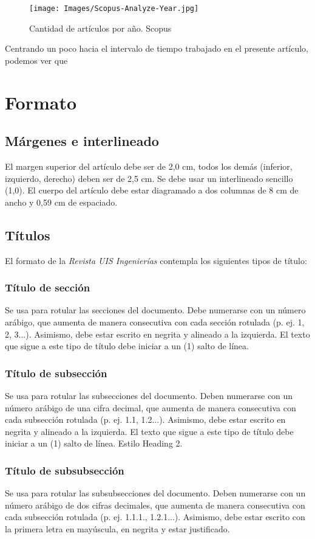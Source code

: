 \documentclass[10pt,letterpaper,twoside,twocolumn]{article}   %
\begin{document}
\begin{figure}
  \centering
  \texttt{[image: Images/Scopus-Analyze-Year.jpg]}
  \caption{Cantidad de artículos por año. Scopus}
  \label{yearResults}
\end{figure}

Centrando un poco hacia el intervalo de tiempo trabajado en el presente artículo, podemos ver que 



\section{Formato}
\subsection{Márgenes e interlineado}
El margen superior del artículo debe ser de 2,0 cm, todos los demás (inferior, izquierdo, derecho) deben ser de 2,5 cm. Se debe usar un interlineado sencillo (1,0). El cuerpo del artículo debe estar diagramado a dos columnas de 8 cm de ancho y 0,59 cm de espaciado.
\subsection{Títulos}
El formato de la \textit{Revista UIS Ingenierías} contempla los siguientes tipos de título:
\subsubsection{Título de sección}
Se usa para rotular las secciones del documento. Debe numerarse con un número arábigo, que aumenta de manera consecutiva con cada sección rotulada (p. ej. 1, 2, 3...). Asimismo, debe estar escrito en negrita y alineado a la izquierda. El texto que sigue a este tipo de título debe iniciar a un (1) salto de línea. 

\subsubsection{Título de subsección}
Se usa para rotular las subsecciones del documento. Deben numerarse con un número arábigo de una cifra decimal, que aumenta de manera consecutiva con cada subsección rotulada  (p. ej. 1.1, 1.2...). Asimismo, debe estar escrito en negrita y alineado a la izquierda. El texto que sigue a este tipo de título debe iniciar a un (1) salto de línea. Estilo Heading 2.

\subsubsection{Título de subsubsección}
Se usa para rotular las subsubsecciones del documento. Deben numerarse con un número arábigo de dos cifras decimales, que aumenta de manera consecutiva con cada subsección rotulada (p. ej. 1.1.1., 1.2.1...). Asimismo, debe estar escrito con la primera letra en mayúscula, en negrita y estar justificado.
\end{document}
